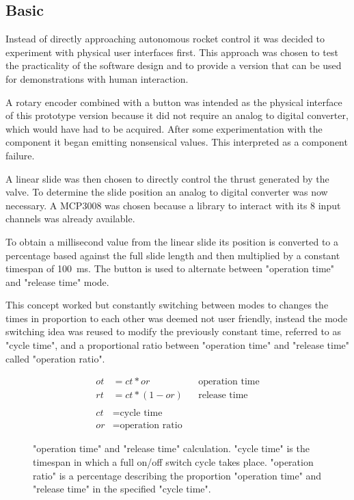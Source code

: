 \subsection{Basic}
Instead of directly approaching autonomous rocket control it was decided to experiment with physical user interfaces first. This approach was chosen to test the practicality of the software design and to provide a version that can be used for demonstrations with human interaction. 

A rotary encoder \cite{rotary-encoder} combined with a button was intended as the physical interface of this prototype version because it did not require an analog to digital converter, which would have had to be acquired. After some experimentation with the component it began emitting nonsensical values. This interpreted as a component failure. 

A linear slide was then chosen to directly control the thrust generated by the valve. To determine the slide position an analog to digital converter was now necessary. A MCP3008 \cite{mcp3008} was chosen because a library \cite{mcp3008-library} to interact with its 8 input channels was already available. 

To obtain a millisecond value from the linear slide its position is converted to a percentage based against the full slide length and then multiplied by a constant timespan of \SI{100}{\milli\second}. The button is used to alternate between "operation time" and "release time" mode. 

This concept worked but constantly switching between modes to changes the times in proportion to each other was deemed not user friendly, instead the mode switching idea was reused to modify the previously constant time, referred to as "cycle time", and a proportional ratio between "operation time" and "release time" called "operation ratio".

\begin{figure}[h]
\begin{align*}
    ot &=ct * or && \text{operation time} \\
    rt &=ct * (1 - or) && \text{release time} \\ \\
    ct &= \text{cycle time} \\
    or &= \text{operation ratio}
\end{align*}
\caption{"operation time" and "release time" calculation. "cycle time" is the timespan in which a full on/off switch cycle takes place. "operation ratio" is a percentage describing the proportion "operation time" and "release time" in the specified "cycle time".}
\end{figure}

